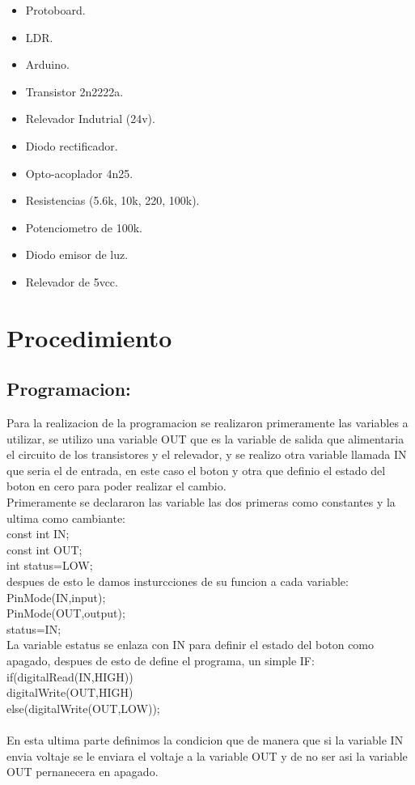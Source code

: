 \documentclass[12pt,a4paper]{article}
\begin{document}
\begin{itemize}
\item Protoboard.
\item LDR.
\item Arduino.
\item Transistor 2n2222a.
\item Relevador Indutrial (24v).
\item Diodo rectificador.
\item Opto-acoplador 4n25.
\item Resistencias (5.6k, 10k, 220, 100k).
\item Potenciometro de 100k.
\item Diodo emisor de luz.
\item Relevador de 5vcc.
\end{itemize} 

\section{Procedimiento}

\subsection{Programacion:}
Para la realizacion de la programacion se realizaron primeramente las variables a utilizar, se utilizo una variable OUT que es la variable de salida que alimentaria el circuito de los transistores y el relevador, y se realizo otra variable llamada IN  que seria el de entrada, en este caso el boton y otra que definio el estado del boton en cero para poder realizar el cambio.\\
Primeramente se declararon las variable las dos primeras como constantes y la ultima como cambiante:\\
const int IN;\\
const int OUT;\\
int status=LOW;\\

despues de esto le damos insturcciones de su funcion a cada variable:\\
PinMode(IN,input);\\
PinMode(OUT,output);\\
status=IN; \\
La variable estatus se enlaza con IN para definir el estado del boton como apagado, despues de esto de define el programa, un simple IF:\\

if(digitalRead(IN,HIGH))\\
{digitalWrite(OUT,HIGH)\\
}else(digitalWrite(OUT,LOW));\\\\
En esta ultima parte definimos la condicion que de manera que si la variable IN envia voltaje se le enviara el voltaje a la variable OUT y de no ser asi la variable OUT pernanecera en apagado.\\
\end{document}
